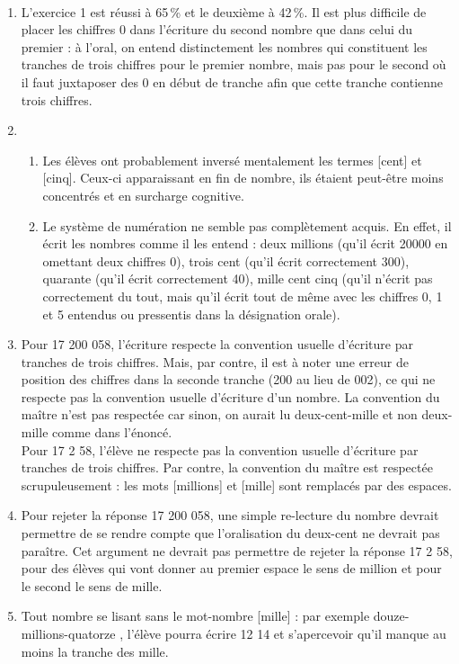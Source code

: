 \ \\ [-5mm]
\begin{enumerate}
   \item L'exercice 1 est réussi à 65\,\% et le deuxième à 42\,\%. Il est plus difficile de placer les chiffres 0 dans l'écriture du second nombre que dans celui du premier : à l'oral, on entend distinctement les nombres qui constituent les tranches de trois chiffres pour le premier nombre, mais pas pour le second où il faut juxtaposer des 0 en début de tranche afin que cette tranche contienne trois chiffres.
   \item
   \begin{enumerate}
      \item Les élèves ont probablement inversé mentalement les termes [cent] et [cinq]. Ceux-ci apparaissant en fin de nombre, ils étaient peut-être moins concentrés et en surcharge cognitive.
      \item Le système de  numération ne semble pas complètement acquis. En effet, il écrit les nombres \og comme il les entend \fg{} : deux millions (qu'il écrit 20000 en omettant deux chiffres 0), trois cent (qu'il écrit correctement 300), quarante (qu'il écrit correctement 40), mille cent cinq (qu'il n'écrit pas correctement du tout, mais qu'il écrit tout de même avec les chiffres 0, 1 et 5 entendus ou pressentis dans la désignation orale).
   \end{enumerate}
   \item Pour 17 200 058, l'écriture respecte la convention usuelle d'écriture par tranches de trois chiffres. Mais, par contre, il est à noter une erreur de position des chiffres dans la seconde tranche (200 au lieu de 002), ce qui ne respecte pas la convention usuelle d'écriture d'un nombre. La convention du maître n'est pas respectée car sinon, on aurait lu \og deux-cent-mille \fg{} et non \og deux-mille \fg{} comme dans l'énoncé. \\
   Pour 17 2 58, l'élève ne respecte pas la convention usuelle d'écriture par tranches de trois chiffres. Par contre, la convention du maître est respectée scrupuleusement : les mots [millions] et [mille] sont remplacés par des espaces.
   \item Pour rejeter la réponse 17 200 058, une simple re-lecture du nombre devrait permettre de se rendre compte que l'oralisation du \og deux-cent \fg{} ne devrait pas paraître. Cet argument ne devrait pas permettre de rejeter la réponse 17 2 58, pour des élèves qui vont donner au premier espace le sens de million et pour le second le sens de mille.
   \item Tout nombre se lisant sans le mot-nombre [mille] : par exemple \og douze-millions-quatorze \fg{}, l'élève pourra écrire 12 14 et s'apercevoir qu'il manque au moins la tranche des mille.
\end{enumerate}
